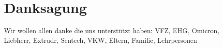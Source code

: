 \chapter*{Danksagung}
\label{chap:Danksagung}
Wir wollen allen danke die uns unterstützt haben:
VFZ, EHG, Omicron, Liebherr, Extrudr, Sentech, VKW, Eltern, Familie, Lehrpersonen
